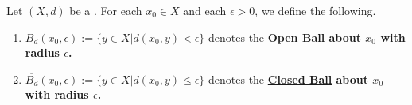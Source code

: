 \label{def:pseudometricball}
\newcommand{\OpenBall}[0]{
    \bf \hyperref[def:pseudometricball]{Open Ball} \rm
}
\newcommand{\ClosedBall}[0]{
    \bf \hyperref[def:pseudometricball]{Closed Ball} \rm
}
\begin{df}
    Let $(X,d)$ be a \PseudometricSpace. 
    For each $x_0  \in X$ and each $\epsilon > 0$, we define the following.
    \begin{enumerate}
        \item  $B_d(x_0, \epsilon) := \{y \in X | d(x_0,y) < \epsilon\}$ denotes the \OpenBall about $x_0$ with radius $\epsilon$. 
    \item $\overline{B_d}(x_0,\epsilon) := \{y \in X | d(x_0,y) \leq \epsilon \}$ denotes the \ClosedBall about $x_0$ with radius $\epsilon$. 
    \end{enumerate} 
    
     
    \end{df} 